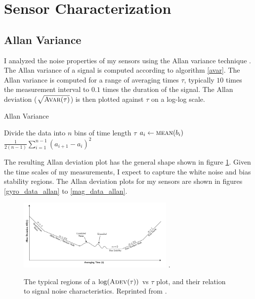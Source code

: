 \documentclass[conference]{IEEEtran}
\begin{document}
\section{Sensor Characterization}
\label{sensor_char}
\subsection{Allan Variance}
I analyzed the noise properties of my sensors using the Allan variance technique \cite{UCAM-CL-TR-696}. The Allan variance of a signal is computed  according to algorithm \ref{avar}. The Allan variance is computed for a range of averaging times $\tau$, typically $10$ times the measurement interval to $0.1$ times the duration of the signal. The Allan deviation ($\sqrt{\textproc{Avar}(\tau)}$) is then plotted against $\tau$ on a log-log scale.\\

\begin{algorithm}
  \caption{Allan Variance}
  \label{avar}
  \begin{algorithmic}
      \State Divide the data into $n$ bins of time length $\tau$
        \State $a_i \gets \Call{mean}{b_i}$
      \EndFor
      \State \Return $\frac{1}{2 (n-1)} \sum_{i=1}^{n-1} (a_{i+1} - a_{i})^2$
      \EndFunction
  \end{algorithmic}
\end{algorithm}

The resulting Allan deviation plot has the general shape shown in figure \ref{allan_regions}. Given the time scales of my measurements, I expect to capture the white noise and bias stability regions. The Allan deviation plots for my sensors are shown in figures \ref{gyro_data_allan} to \ref{mag_data_allan}. \\

\begin{figure}[!t]
  \centering
  \includegraphics[width=3in]{figures/allan_regions.png}
  \DeclareGraphicsExtensions.
  \caption{The typical regions of a $\log(\textproc{Adev}(\tau))$ vs $\tau$ plot, and their relation to signal noise characteristics. Reprinted from \cite{UCAM-CL-TR-696}.}
  \label{allan_regions}
\end{figure}
\end{document}
